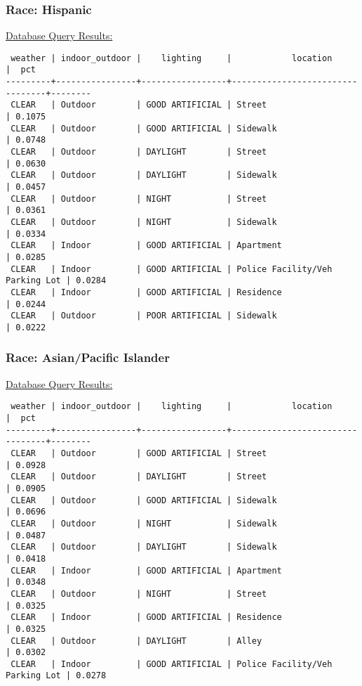 \documentclass[10pt]{article}
\begin{document}
\subsubsection*{Race: Hispanic}

\underline{Database Query Results:}

\begin{verbatim}
 weather | indoor_outdoor |    lighting     |            location             |  pct
---------+----------------+-----------------+---------------------------------+--------
 CLEAR   | Outdoor        | GOOD ARTIFICIAL | Street                          | 0.1075
 CLEAR   | Outdoor        | GOOD ARTIFICIAL | Sidewalk                        | 0.0748
 CLEAR   | Outdoor        | DAYLIGHT        | Street                          | 0.0630
 CLEAR   | Outdoor        | DAYLIGHT        | Sidewalk                        | 0.0457
 CLEAR   | Outdoor        | NIGHT           | Street                          | 0.0361
 CLEAR   | Outdoor        | NIGHT           | Sidewalk                        | 0.0334
 CLEAR   | Indoor         | GOOD ARTIFICIAL | Apartment                       | 0.0285
 CLEAR   | Indoor         | GOOD ARTIFICIAL | Police Facility/Veh Parking Lot | 0.0284
 CLEAR   | Indoor         | GOOD ARTIFICIAL | Residence                       | 0.0244
 CLEAR   | Outdoor        | POOR ARTIFICIAL | Sidewalk                        | 0.0222
\end{verbatim}

\subsubsection*{Race: Asian/Pacific Islander}

\underline{Database Query Results:}

\begin{verbatim}
 weather | indoor_outdoor |    lighting     |            location             |  pct
---------+----------------+-----------------+---------------------------------+--------
 CLEAR   | Outdoor        | GOOD ARTIFICIAL | Street                          | 0.0928
 CLEAR   | Outdoor        | DAYLIGHT        | Street                          | 0.0905
 CLEAR   | Outdoor        | GOOD ARTIFICIAL | Sidewalk                        | 0.0696
 CLEAR   | Outdoor        | NIGHT           | Sidewalk                        | 0.0487
 CLEAR   | Outdoor        | DAYLIGHT        | Sidewalk                        | 0.0418
 CLEAR   | Indoor         | GOOD ARTIFICIAL | Apartment                       | 0.0348
 CLEAR   | Outdoor        | NIGHT           | Street                          | 0.0325
 CLEAR   | Indoor         | GOOD ARTIFICIAL | Residence                       | 0.0325
 CLEAR   | Outdoor        | DAYLIGHT        | Alley                           | 0.0302
 CLEAR   | Indoor         | GOOD ARTIFICIAL | Police Facility/Veh Parking Lot | 0.0278
\end{verbatim}
\end{document}
